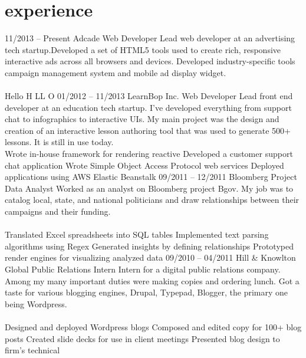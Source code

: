 \documentclass[]{friggeri-cv}
\begin{document}
\section{experience}
\begin{entrylist}
  \entry
    {11/2013 – Present}
    {Adcade}
    {Web Developer}
    {Lead web developer at an advertising tech startup.Developed a set of HTML5 tools used to create rich, responsive interactive ads across all browsers and devices. Developed industry-specific tools campaign management system and mobile ad display widget.\\%
    \\%
      \jobdesc
      {Hello}
      {H}
      {LL}
      {O}
    }
  \entry
    {01/2012 – 11/2013}
    {LearnBop Inc.}
    {Web Developer}
    {Lead front end developer at an education tech startup. I've developed everything from support chat to infographics to interactive UIs. My main project was the design and creation of an interactive lesson authoring tool that was used to generate 500+ lessons. It is still in use today.
    \\%
      \jobdesc
      {Wrote in-house framework for rendering reactive }
      {Developed a customer support chat application }
      {Wrote Simple Object Access Protocol web services }
      {Deployed applications using AWS Elastic Beanstalk}
    }
  \entry
    {09/2011 – 12/2011}
    {Bloomberg}
    {Project Data Analyst}
    {Worked as an analyst on Bloomberg project Bgov. My job was to catalog local, state, and national politicians and draw relationships between their campaigns and their funding.\\%
    \\%
      \jobdesc
      {Translated Excel spreadsheets into SQL tables}
      {Implemented text parsing algorithms using Regex}
      {Generated insights by defining relationships }
      {Prototyped render engines for visualizing analyzed data}
    }
  \entry
    {09/2010 – 04/2011}
    {Hill \& Knowlton Global Public Relations}
    {Intern}
    {Intern for a digital public relations company. Among my many important duties were making copies and ordering lunch. Got a taste for various blogging engines, Drupal, Typepad, Blogger, the primary one being Wordpress.\\%
    \\%
      \jobdesc
      {Designed and deployed Wordpress blogs}
      {Composed and edited copy for 100+ blog posts}
      {Created slide decks for use in client meetings}
      {Presented blog design to firm's technical }
    }
\end{entrylist}
\end{document}
